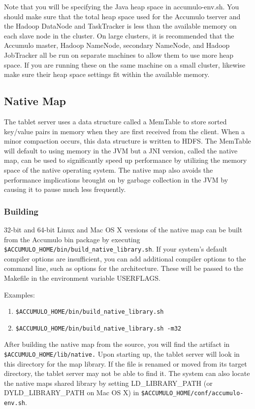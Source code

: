 Note that you will be specifying the Java heap space in accumulo-env.sh. You should
make sure that the total heap space used for the Accumulo tserver and the Hadoop
DataNode and TaskTracker is less than the available memory on each slave node in
the cluster. On large clusters, it is recommended that the Accumulo master, Hadoop
NameNode, secondary NameNode, and Hadoop JobTracker all be run on separate
machines to allow them to use more heap space. If you are running these on the
same machine on a small cluster, likewise make sure their heap space settings fit
within the available memory.

\subsection{Native Map}

The tablet server uses a data structure called a MemTable to store sorted key/value
pairs in memory when they are first received from the client. When a minor compaction
occurs, this data structure is written to HDFS. The MemTable will default to using
memory in the JVM but a JNI version, called the native map, can be used to significantly
speed up performance by utilizing the memory space of the native operating system. The
native map also avoids the performance implications brought on by garbage collection
in the JVM by causing it to pause much less frequently.

\subsubsection{Building}

32-bit and 64-bit Linux and Mac OS X versions of the native map can be built
from the Accumulo bin package by executing
\texttt{\$ACCUMULO\_HOME/bin/build\_native\_library.sh}. If your system's
default compiler options are insufficient, you can add additional compiler
options to the command line, such as options for the architecture. These will be
passed to the Makefile in the environment variable USERFLAGS.

Examples:

\begin{enumerate}
\item{\texttt{\$ACCUMULO\_HOME/bin/build\_native\_library.sh}}
\item{\texttt{\$ACCUMULO\_HOME/bin/build\_native\_library.sh -m32}}
\end{enumerate}

After building the native map from the source, you will find the artifact in
\texttt{\$ACCUMULO\_HOME/lib/native.} Upon starting up, the tablet server will look
in this directory for the map library. If the file is renamed or moved from its
target directory, the tablet server may not be able to find it. The system can
also locate the native maps shared library by setting LD\_LIBRARY\_PATH
(or DYLD\_LIBRARY\_PATH on Mac OS X) in \texttt{\$ACCUMULO\_HOME/conf/accumulo-env.sh}.

